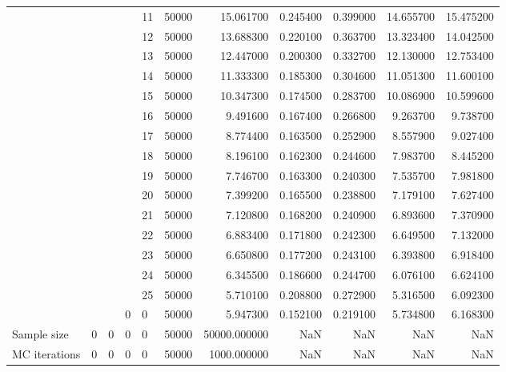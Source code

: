 \begin{tabular}{llllllrrrrr}
\cline{5-11}
 &  &  &  & 11 & 50000 & 15.061700 & 0.245400 & 0.399000 & 14.655700 & 15.475200 \\
\cline{5-11}
 &  &  &  & 12 & 50000 & 13.688300 & 0.220100 & 0.363700 & 13.323400 & 14.042500 \\
\cline{5-11}
 &  &  &  & 13 & 50000 & 12.447000 & 0.200300 & 0.332700 & 12.130000 & 12.753400 \\
\cline{5-11}
 &  &  &  & 14 & 50000 & 11.333300 & 0.185300 & 0.304600 & 11.051300 & 11.600100 \\
\cline{5-11}
 &  &  &  & 15 & 50000 & 10.347300 & 0.174500 & 0.283700 & 10.086900 & 10.599600 \\
\cline{5-11}
 &  &  &  & 16 & 50000 & 9.491600 & 0.167400 & 0.266800 & 9.263700 & 9.738700 \\
\cline{5-11}
 &  &  &  & 17 & 50000 & 8.774400 & 0.163500 & 0.252900 & 8.557900 & 9.027400 \\
\cline{5-11}
 &  &  &  & 18 & 50000 & 8.196100 & 0.162300 & 0.244600 & 7.983700 & 8.445200 \\
\cline{5-11}
 &  &  &  & 19 & 50000 & 7.746700 & 0.163300 & 0.240300 & 7.535700 & 7.981800 \\
\cline{5-11}
 &  &  &  & 20 & 50000 & 7.399200 & 0.165500 & 0.238800 & 7.179100 & 7.627400 \\
\cline{5-11}
 &  &  &  & 21 & 50000 & 7.120800 & 0.168200 & 0.240900 & 6.893600 & 7.370900 \\
\cline{5-11}
 &  &  &  & 22 & 50000 & 6.883400 & 0.171800 & 0.242300 & 6.649500 & 7.132000 \\
\cline{5-11}
 &  &  &  & 23 & 50000 & 6.650800 & 0.177200 & 0.243100 & 6.393800 & 6.918400 \\
\cline{5-11}
 &  &  &  & 24 & 50000 & 6.345500 & 0.186600 & 0.244700 & 6.076100 & 6.624100 \\
\cline{5-11}
 &  &  &  & 25 & 50000 & 5.710100 & 0.208800 & 0.272900 & 5.316500 & 6.092300 \\
\cline{4-11} \cline{5-11}
 &  &  & 0 & 0 & 50000 & 5.947300 & 0.152100 & 0.219100 & 5.734800 & 6.168300 \\
\cline{1-11} \cline{2-11} \cline{3-11} \cline{4-11} \cline{5-11}
Sample size & 0 & 0 & 0 & 0 & 50000 & 50000.000000 & NaN & NaN & NaN & NaN \\
\cline{1-11} \cline{2-11} \cline{3-11} \cline{4-11} \cline{5-11}
MC iterations & 0 & 0 & 0 & 0 & 50000 & 1000.000000 & NaN & NaN & NaN & NaN \\
\cline{1-11} \cline{2-11} \cline{3-11} \cline{4-11} \cline{5-11}

\end{tabular}
